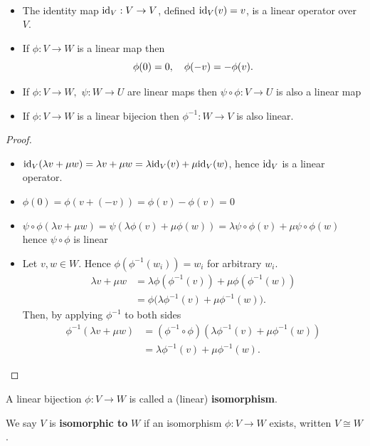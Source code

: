 \begin{lemma} $ $

    \begin{itemize}
        \item The identity map $\mathrm{id}_V : V \rightarrow V$, defined $\mathrm{id}_V(v) = v$, is a linear operator over $V$.
        \item If $\phi : V \rightarrow W$ is a linear map then
            \[\phi(0) = 0, \\ \quad \phi(-v) = - \phi(v).\]
        \item If $\phi : V \rightarrow W,$ $\psi : W \rightarrow U$ are linear maps then $\psi \circ \phi : V \rightarrow U$ is also a linear map
        \item If $\phi: V\rightarrow W$ is a linear bijecion then $\phi^{-1} : W \rightarrow V$ is also linear.
    \end{itemize}
\end{lemma}
\begin{proof} $ $

    \begin{itemize}
      \item $\mathrm{id}_V (\lambda v + \mu w) = \lambda v + \mu w = \lambda  \mathrm{id}_V(v) + \mu \mathrm{id}_V(w)$, hence $\mathrm{id}_V$ is a linear operator.
      \item $\phi(0) = \phi( v + (-v)) = \phi(v) - \phi(v) = 0$
      \item $\psi \circ \phi (\lambda v + \mu w) = \psi(\lambda \phi(v) + \mu \phi(w)) = \lambda \psi \circ \phi(v) + \mu \psi \circ \phi (w)$ hence $\psi \circ \phi$ is linear
      \item Let $v, w \in W$. Hence $\phi (\phi^{-1}(w_i)) = w_i$ for arbitrary $w_i$.
    \begin{align*}
    \lambda v + \mu w
        &= \lambda \phi(\phi^{-1}(v)) + \mu \phi(\phi^{-1}(w)) \\
        &= \phi\big(\lambda \phi^{-1}(v) + \mu \phi^{-1}(w)\big).
    \end{align*}
        Then, by applying $\phi^{-1}$ to both sides
    \begin{align*}
    \phi^{-1}(\lambda v + \mu w)
        &= (\phi^{-1} \circ \phi)(\lambda \phi^{-1}(v) + \mu \phi^{-1}(w)) \\
        &= \lambda \phi^{-1}(v) + \mu \phi^{-1}(w).
    \end{align*}
    \end{itemize}
\end{proof}

\begin{definition}
  A linear bijection $\phi : V \rightarrow W$ is called a (linear) {\bf isomorphism}. 

  We say $V$ is {\bf isomorphic to} $W$ if an isomorphism $\phi : V\rightarrow W$ exists, written $V \cong W$.
\end{definition}


